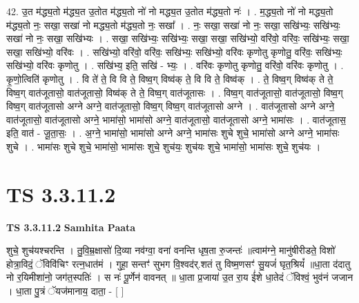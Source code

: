 \documentclass[17pt]{extarticle}
\begin{document}
42. उ॒त म॑द्ध्य॒तो म॑द्ध्य॒त उ॒तोत म॑द्ध्य॒तो नो॑ नो मद्ध्य॒त उ॒तोत म॑द्ध्य॒तो नः॑ । . म॒द्ध्य॒तो नो॑ नो मद्ध्य॒तो म॑द्ध्य॒तो नः॒ सखा॒ सखा॑ नो मद्ध्य॒तो म॑द्ध्य॒तो नः॒ सखा᳚ । . नः॒ सखा॒ सखा॑ नो नः॒ सखा॒ सखि॑भ्यः॒ सखि॑भ्यः॒ सखा॑ नो नः॒ सखा॒ सखि॑भ्यः । . सखा॒ सखि॑भ्यः॒ सखि॑भ्यः॒ सखा॒ सखा॒ सखि॑भ्यो॒ वरि॑वो॒ वरि॑वः॒ सखि॑भ्यः॒ सखा॒ सखा॒ सखि॑भ्यो॒ वरि॑वः । . सखि॑भ्यो॒ वरि॑वो॒ वरि॑वः॒ सखि॑भ्यः॒ सखि॑भ्यो॒ वरि॑वः कृणोतु कृणोतु॒ वरि॑वः॒ सखि॑भ्यः॒ सखि॑भ्यो॒ वरि॑वः कृणोतु । . सखि॑भ्य॒ इति॒ सखि॑ - भ्यः॒ । . वरि॑वः कृणोतु कृणोतु॒ वरि॑वो॒ वरि॑वः कृणोतु । . कृ॒णो॒त्विति॑ कृणोतु । . वि ते॑ ते॒ वि वि ते॒ विष्व॒ग् विष्व॑क् ते॒ वि वि ते॒ विष्व॑क् । . ते॒ विष्व॒ग् विष्व॑क् ते ते॒ विष्व॒ग् वात॑जूतासो॒ वात॑जूतासो॒ विष्व॑क् ते ते॒ विष्व॒ग् वात॑जूतासः । . विष्व॒ग् वात॑जूतासो॒ वात॑जूतासो॒ विष्व॒ग् विष्व॒ग् वात॑जूतासो अग्ने अग्ने॒ वात॑जूतासो॒ विष्व॒ग् विष्व॒ग् वात॑जूतासो अग्ने । . वात॑जूतासो अग्ने अग्ने॒ वात॑जूतासो॒ वात॑जूतासो अग्ने॒ भामा॑सो॒ भामा॑सो अग्ने॒ वात॑जूतासो॒ वात॑जूतासो अग्ने॒ भामा॑सः । . वात॑जूतास॒ इति॒ वात॑ - जू॒ता॒सः॒ । . अ॒ग्ने॒ भामा॑सो॒ भामा॑सो अग्ने अग्ने॒ भामा॑सः शुचे शुचे॒ भामा॑सो अग्ने अग्ने॒ भामा॑सः शुचे । . भामा॑सः शुचे शुचे॒ भामा॑सो॒ भामा॑सः शुचे॒ शुच॑यः॒ शुच॑यः शुचे॒ भामा॑सो॒ भामा॑सः शुचे॒ शुच॑यः । \newline
\pagebreak
{}

\section{ TS 3.3.11.2 }

\textbf{TS 3.3.11.2 } \newline
\textbf{Samhita Paata} \newline

शुचे॒ शुच॑यश्चरन्ति । तु॒वि॒म्र॒क्षासो॑ दि॒व्या नव॑ग्वा॒ वना॑ वनन्ति धृष॒ता रु॒जन्तः॑ ॥त्वाम॑ग्ने॒ मानु॑षीरीडते॒ विशो॑ होत्रा॒विदं॒ ॅविवि॑चिꣳ रत्न॒धात॑मं । गुहा॒ सन्तꣳ॑ सुभग वि॒श्वद॑र्.शतं तु विष्म॒णसꣳ॑ सु॒यजं॑ घृत॒श्रियं᳚ ॥धा॒ता द॑दातु नो र॒यिमीशा॑नो॒ जग॑त॒स्पतिः॑ । स नः॑ पू॒र्णेन॑ वावनत् ॥ धा॒ता प्र॒जाया॑ उ॒त रा॒य ई॑शे धा॒तेदं ॅविश्वं॒ भुव॑नं जजान । धा॒ता पु॒त्रं ॅयज॑मानाय॒ दाता॒ - [  ] \newline
\end{document}
